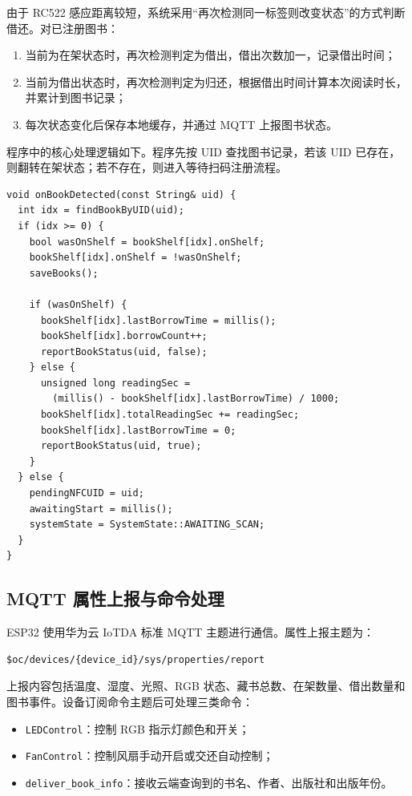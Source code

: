 \documentclass[12pt,hyperref,a4paper,UTF8]{ctexart}
\begin{document}
由于 RC522 感应距离较短，系统采用“再次检测同一标签则改变状态”的方式判断借还。对已注册图书：

\begin{enumerate}
    \item 当前为在架状态时，再次检测判定为借出，借出次数加一，记录借出时间；
    \item 当前为借出状态时，再次检测判定为归还，根据借出时间计算本次阅读时长，并累计到图书记录；
    \item 每次状态变化后保存本地缓存，并通过 MQTT 上报图书状态。
\end{enumerate}

程序中的核心处理逻辑如下。程序先按 UID 查找图书记录，若该 UID 已存在，则翻转在架状态；若不存在，则进入等待扫码注册流程。

\begin{lstlisting}
void onBookDetected(const String& uid) {
  int idx = findBookByUID(uid);
  if (idx >= 0) {
    bool wasOnShelf = bookShelf[idx].onShelf;
    bookShelf[idx].onShelf = !wasOnShelf;
    saveBooks();

    if (wasOnShelf) {
      bookShelf[idx].lastBorrowTime = millis();
      bookShelf[idx].borrowCount++;
      reportBookStatus(uid, false);
    } else {
      unsigned long readingSec =
        (millis() - bookShelf[idx].lastBorrowTime) / 1000;
      bookShelf[idx].totalReadingSec += readingSec;
      bookShelf[idx].lastBorrowTime = 0;
      reportBookStatus(uid, true);
    }
  } else {
    pendingNFCUID = uid;
    awaitingStart = millis();
    systemState = SystemState::AWAITING_SCAN;
  }
}
\end{lstlisting}

\subsection{MQTT 属性上报与命令处理}

ESP32 使用华为云 IoTDA 标准 MQTT 主题进行通信。属性上报主题为：

\begin{lstlisting}
$oc/devices/{device_id}/sys/properties/report
\end{lstlisting}

上报内容包括温度、湿度、光照、RGB 状态、藏书总数、在架数量、借出数量和图书事件。设备订阅命令主题后可处理三类命令：

\begin{itemize}
    \item \texttt{LEDControl}：控制 RGB 指示灯颜色和开关；
    \item \texttt{FanControl}：控制风扇手动开启或交还自动控制；
    \item \texttt{deliver\_book\_info}：接收云端查询到的书名、作者、出版社和出版年份。
\end{itemize}
\end{document}
